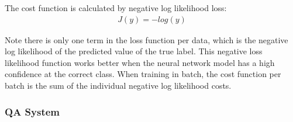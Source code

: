 
The cost function is calculated by negative log likelihood loss:
\begin{align*}
    J(y) = -log(y) 
\end{align*}

Note there is only one term in the loss function per data, which is the negative log likelihood of the predicted value of the true label. This negative loss likelihood function works better when the neural network model has a high confidence at the correct class. When training in batch, the cost function per batch is the sum of the individual negative log likelihood costs.

\subsubsection{QA System}


